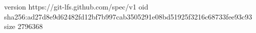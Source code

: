 version https://git-lfs.github.com/spec/v1
oid sha256:ad27d8e9d62482fd12bf7b997cab3505291e08bd51925f3216c68733fee93c93
size 2796368
